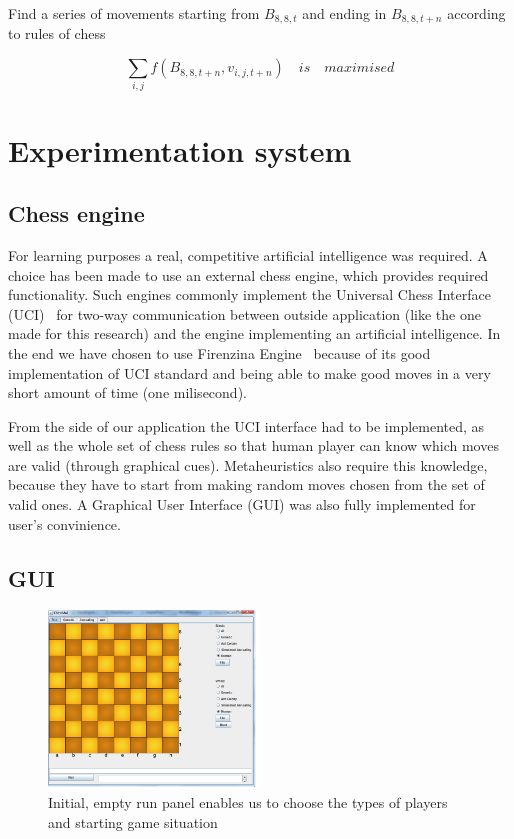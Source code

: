 \documentclass[pdftex]{article}
\begin{document}
Find a series of movements starting from $B_{8,8,t}$ and ending in $B_{8,8,t+n}$ according to rules of chess

\begin{equation}
\label{eq:costfunction}
	\sum_{i,j} f(B_{8,8,t+n},v_{i,j,t+n}) \quad is \quad maximised
\end{equation}


\section{Experimentation system}
\label{sec:project}

\subsection{Chess engine}
\label{sec:engine}

For learning purposes a real, competitive artificial intelligence was required. A choice has been made to use an external chess engine, which provides required functionality. Such engines commonly implement the Universal Chess Interface (UCI)~\cite{uci} for two-way communication between outside application (like the one made for this research) and the engine implementing an artificial intelligence. 
In the end we have chosen to use Firenzina Engine~\cite{firenzina} because of its good implementation of UCI standard and being able to make good moves in a very short amount of time (one milisecond).

From the side of our application the UCI interface had to be implemented, as well as the whole set of chess rules so that human player can know which moves are valid (through graphical cues). Metaheuristics also require this knowledge, because they have to start from making random moves chosen from the set of valid ones. A Graphical User Interface (GUI) was also fully implemented for user's convinience.

\subsection{GUI}
\label{sec:uci}

\begin{figure}[!htb]
	\centering
	\includegraphics[width=0.5\textwidth]{chessImages/Initial.png} 
	\caption{Initial, empty run panel enables us to choose the types of players and starting game situation}
	\label{fig:initialRunPanel}
\end{figure}
\end{document}
